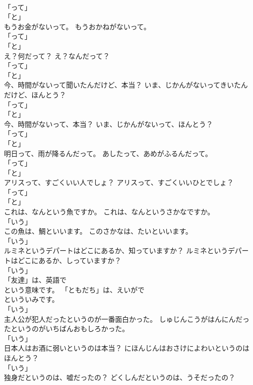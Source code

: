 \documentclass[8pt]{extreport}
\begin{document}
\begin{CJK}{UTF8}{min}
\\	「って」 
\\	「と」	
\\	もうお金がないって。	もうおかねがないって。	
\\	「って」 
\\	「と」	
\\	え？何だって？	え？なんだって？	
\\	「って」 
\\	「と」	
\\	今、時間がないって聞いたんだけど、本当？	いま、じかんがないってきいたんだけど、ほんとう？	
\\	「って」 
\\	「と」	
\\	今、時間がないって、本当？	いま、じかんがないって、ほんとう？	
\\	「って」 
\\	「と」	
\\	明日って、雨が降るんだって。	あしたって、あめがふるんだって。	
\\	「って」 
\\	「と」	
\\	アリスって、すごくいい人でしょ？	アリスって、すごくいいひとでしょ？	
\\	「って」 
\\	「と」	
\\	これは、なんという魚ですか。	これは、なんというさかなですか。	
\\	「いう」 
\\	この魚は、鯛といいます。	このさかなは、たいといいます。	
\\	「いう」 
\\	ルミネというデパートはどこにあるか、知っていますか？	ルミネというデパートはどこにあるか、しっていますか？	
\\	「いう」 
\\	「友達」は、英語で
\\	という意味です。	「ともだち」は、えいがで
\\	といういみです。	
\\	「いう」 
\\	主人公が犯人だったというのが一番面白かった。	しゅじんこうがはんにんだったというのがいちばんおもしろかった。	
\\	「いう」 
\\	日本人はお酒に弱いというのは本当？	にほんじんはおさけによわいというのはほんとう？	
\\	「いう」 
\\	独身だというのは、嘘だったの？	どくしんだというのは、うそだったの？	

\end{CJK}
\end{document}
